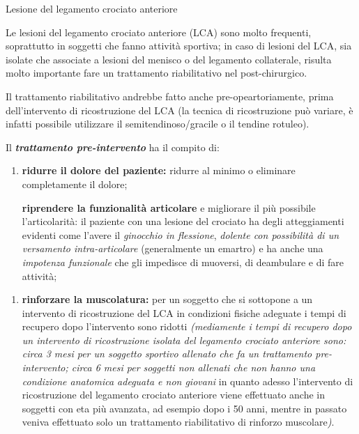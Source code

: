 \documentclass[]{article}
\date{}
\begin{document}
Lesione del legamento crociato anteriore

Le lesioni del legamento crociato anteriore (LCA) sono molto frequenti,
soprattutto in soggetti che fanno attività sportiva; in caso di lesioni
del LCA, sia isolate che associate a lesioni del menisco o del legamento
collaterale, risulta molto importante fare un trattamento riabilitativo
nel post-chirurgico.

Il trattamento riabilitativo andrebbe fatto anche pre-opeartoriamente,
prima dell'intervento di ricostruzione del LCA (la tecnica di
ricostruzione può variare, è infatti possibile utilizzare il
semitendinoso/gracile o il tendine rotuleo).

Il \textbf{\emph{trattamento pre-intervento}} ha il compito di:

\begin{enumerate}
\def\labelenumi{\arabic{enumi}.}
\item
  \textbf{ridurre il dolore del paziente:} ridurre al minimo o eliminare
  completamente il dolore;

  \textbf{riprendere la funzionalità articolare} e migliorare il più
  possibile l'articolarità: il paziente con una lesione del crociato ha
  degli atteggiamenti evidenti come l'avere il \emph{ginocchio in
  flessione}, \emph{dolente con possibilità di un versamento
  intra-articolare} (generalmente un emartro) e ha anche una
  \emph{impotenza funzionale} che gli impedisce di muoversi, di
  deambulare e di fare attività;
\end{enumerate}

\begin{enumerate}
\def\labelenumi{\arabic{enumi}.}
\item
  \textbf{rinforzare la muscolatura:} per un soggetto che si sottopone a
  un intervento di ricostruzione del LCA in condizioni fisiche adeguate
  i tempi di recupero dopo l'intervento sono ridotti \emph{(mediamente i
  \emph{tempi di recupero} dopo un intervento di ricostruzione isolata
  del legamento crociato anteriore sono: circa \emph{3 mesi} per un
  soggetto sportivo allenato che fa un trattamento pre-intervento; circa
  \emph{6 mesi} per soggetti non allenati che non hanno una condizione
  anatomica adeguata e non giovani} in quanto adesso l'intervento di
  ricostruzione del legamento crociato anteriore viene effettuato anche
  in soggetti con eta più avanzata, ad esempio dopo i 50 anni, mentre in
  passato veniva effettuato solo un trattamento riabilitativo di
  rinforzo muscolare\emph{)}.
\end{enumerate}
\end{document}

